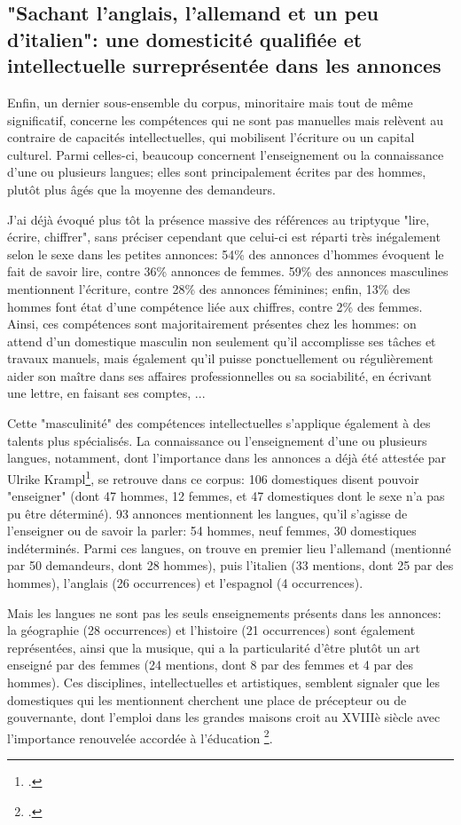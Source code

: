 \subsection{"Sachant l'anglais, l'allemand et un peu d'italien": une domesticité qualifiée et intellectuelle surreprésentée dans les annonces}

Enfin, un dernier sous-ensemble du corpus, minoritaire mais tout de même significatif, concerne les compétences qui ne sont pas manuelles mais relèvent au contraire de capacités intellectuelles, qui mobilisent l'écriture ou un capital culturel. Parmi celles-ci, beaucoup concernent l'enseignement ou la connaissance d'une ou plusieurs langues; elles sont principalement écrites par des hommes, plutôt plus âgés que la moyenne des demandeurs.

J'ai déjà évoqué plus tôt la présence massive des références au triptyque "lire, écrire, chiffrer", sans préciser cependant que celui-ci est réparti très inégalement selon le sexe dans les petites annonces: 54\% des annonces d'hommes évoquent le fait de savoir lire, contre 36\% annonces de femmes. 59\% des annonces masculines mentionnent l'écriture, contre 28\% des annonces féminines; enfin, 13\% des hommes font état d'une compétence liée aux chiffres, contre 2\% des femmes. Ainsi, ces compétences sont majoritairement présentes chez les hommes: on attend d'un domestique masculin non seulement qu'il accomplisse ses tâches et travaux manuels, mais également qu'il puisse ponctuellement ou régulièrement aider son maître dans ses affaires professionnelles ou sa sociabilité, en écrivant une lettre, en faisant ses comptes, ... 

Cette "masculinité" des compétences intellectuelles s'applique également à des talents plus spécialisés. La connaissance ou l'enseignement d'une ou plusieurs langues, notamment, dont l'importance dans les annonces a déjà été attestée par Ulrike Krampl\footcites{kramplTravaillerAvecLangues2019}, se retrouve dans ce corpus: 106 domestiques disent pouvoir "enseigner" (dont 47 hommes, 12 femmes, et 47 domestiques dont le sexe n'a pas pu être déterminé). 93 annonces mentionnent les langues, qu'il s'agisse de l'enseigner ou de savoir la parler: 54 hommes, neuf femmes, 30 domestiques indéterminés. Parmi ces langues, on trouve en premier lieu l'allemand (mentionné par 50 demandeurs, dont 28 hommes), puis l'italien (33 mentions, dont 25 par des hommes), l'anglais (26 occurrences) et l'espagnol (4 occurrences).

Mais les langues ne sont pas les seuls enseignements présents dans les annonces: la géographie (28 occurrences) et l'histoire (21 occurrences) sont également représentées, ainsi que la musique, qui a la particularité d'être plutôt un art enseigné par des femmes (24 mentions, dont 8 par des femmes et 4 par des hommes). Ces disciplines, intellectuelles et artistiques, semblent signaler que les domestiques qui les mentionnent cherchent une place de précepteur ou de gouvernante, dont l'emploi dans les grandes maisons croit au XVIIIè siècle avec l'importance renouvelée accordée à l'éducation \footcites{sabattierChapitreIntimiteConstante1984}.

